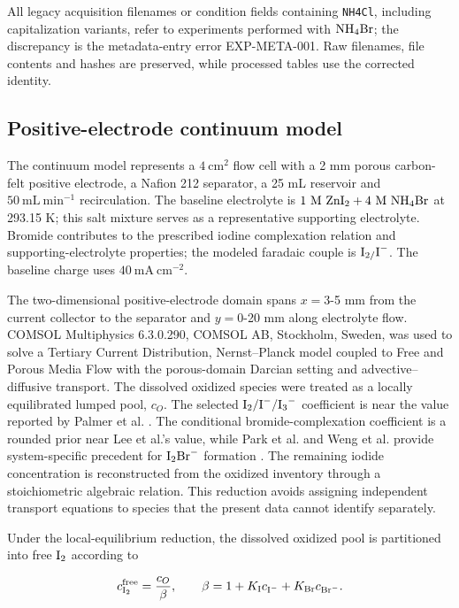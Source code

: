 \documentclass[11pt]{article}
\begin{document}
All legacy acquisition filenames or condition fields containing \texttt{NH4Cl}, including capitalization variants, refer to experiments performed with $\ce{NH4Br}$; the discrepancy is the metadata-entry error EXP-META-001. Raw filenames, file contents and hashes are preserved, while processed tables use the corrected identity.

\subsection{Positive-electrode continuum model}


The continuum model represents a $4~\mathrm{cm^2}$ flow cell with a 2 mm porous carbon-felt positive electrode, a Nafion 212 separator, a 25 mL reservoir and $50~\mathrm{mL~min^{-1}}$ recirculation. The baseline electrolyte is $1~\mathrm{M}~\ce{ZnI2}+4~\mathrm{M}~\ce{NH4Br}$ at 293.15 K; this salt mixture serves as a representative supporting electrolyte. Bromide contributes to the prescribed iodine complexation relation and supporting-electrolyte properties; the modeled faradaic couple is $\ce{I2/I^-}$. The baseline charge uses $40~\mathrm{mA~cm^{-2}}$.

The two-dimensional positive-electrode domain spans $x=3$-5 mm from the current collector to the separator and $y=0$-20 mm along electrolyte flow. COMSOL Multiphysics 6.3.0.290, COMSOL AB, Stockholm, Sweden, was used to solve a Tertiary Current Distribution, Nernst--Planck model coupled to Free and Porous Media Flow with the porous-domain Darcian setting and advective--diffusive transport. The dissolved oxidized species were treated as a locally equilibrated lumped pool, $c_O$. The selected $\ce{I2}/\ce{I^-}/\ce{I3^-}$ coefficient is near the value reported by Palmer et al. \citep{Palmer1984}. The conditional bromide-complexation coefficient is a rounded prior near Lee et al.'s value, while Park et al. and Weng et al. provide system-specific precedent for $\ce{I2Br^-}$ formation \citep{Lee2023,Park2021,Weng2017}. The remaining iodide concentration is reconstructed from the oxidized inventory through a stoichiometric algebraic relation. This reduction avoids assigning independent transport equations to species that the present data cannot identify separately.

Under the local-equilibrium reduction, the dissolved oxidized pool is partitioned into free $\ce{I2}$ according to

\[
c_{\ce{I2}}^{\mathrm{free}}=\frac{c_O}{\beta}, \qquad
\beta=1+K_{\mathrm I}c_{\ce{I^-}}+K_{\mathrm{Br}}c_{\ce{Br^-}}.
\]
\end{document}
